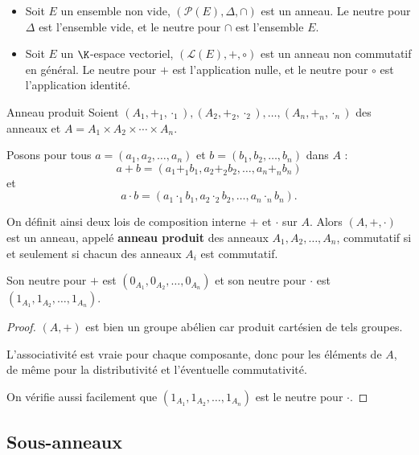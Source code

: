 \begin{exemple}
    \begin{itemize}
        \item Soit $E$ un ensemble non vide, $(\mathscr P (E), \Delta, \cap)$ est un anneau. Le neutre pour $\Delta$ est l'ensemble vide, 
        et le neutre pour $\cap$ est l'ensemble $E$.

        \item Soit $E$ un $\K$-espace vectoriel, $(\mathscr L (E), +, \circ)$ est un anneau non commutatif en général. Le neutre pour $+$ est l'application nulle, et le neutre pour $\circ$ est l'application identité.
    \end{itemize}
\end{exemple}

\begin{proposition}{Anneau produit}{}
    Soient $(A_1, +_1, \cdot_1), (A_2, +_2, \cdot_2), \ldots, (A_n, +_n, \cdot_n)$ des anneaux et $A = A_1 \times A_2 \times \cdots \times A_n$.

    Posons pour tous $a = (a_1, a_2, \ldots, a_n)$ et $b = (b_1, b_2, \ldots, b_n)$ dans $A$ :
    \[a + b = (a_1 +_1 b_1, a_2 +_2 b_2, \ldots, a_n +_n b_n)\]
    et
    \[a \cdot b = (a_1 \cdot_1 b_1, a_2 \cdot_2 b_2, \ldots, a_n \cdot_n b_n).\]

    On définit ainsi deux lois de composition interne $+$ et $\cdot$ sur $A$.
    Alors $(A, +, \cdot)$ est un anneau, appelé \textbf{anneau produit} des anneaux $A_1, A_2, \ldots, A_n$, 
    commutatif si et seulement si chacun des anneaux $A_i$ est commutatif.

    Son neutre pour $+$ est $(0_{A_1}, 0_{A_2}, \ldots, 0_{A_n})$ et son neutre pour $\cdot$ est $(1_{A_1}, 1_{A_2}, \ldots, 1_{A_n})$.
\end{proposition}

\begin{proof}
    $(A, +)$ est bien un groupe abélien car produit cartésien de tels groupes.

    \svspace L'associativité est vraie pour chaque composante, donc pour les éléments de $A$, 
    de même pour la distributivité et l'éventuelle commutativité.

    \svspace On vérifie aussi facilement que 
    $(1_{A_1}, 1_{A_2}, \ldots, 1_{A_n})$ est le neutre pour $\cdot$.
\end{proof}

\subsection{Sous-anneaux}

